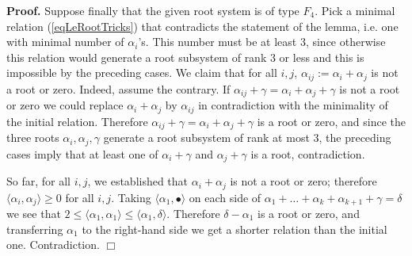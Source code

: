 \documentclass[12pt]{report}
\newtheorem{lemma}[theo]{Lemma}
\newtheorem{corollary}[theo]{Corollary}
\newenvironment{proof}[1][]{ \textbf{Proof#1. }}{$\Box$\medskip}
\newcommand{\kk}{\mathfrak{k}}
\newcommand{\hh}{\mathfrak{h}}
\newcommand{\gG}{\mathfrak{g}}
\newcommand{\linspan}{\mathrm{span}}
\begin{document}
\begin{proof}
Suppose finally that the given root system is of type $F_4$. Pick a minimal relation (\ref{eqLeRootTricks}) that contradicts the statement of the lemma, i.e. one with minimal number of $\alpha_i$'s. This number must be at least 3, since otherwise this relation would generate a root subsystem of rank 3 or less and this is impossible by the preceding cases. We claim that for all $i,j$, $\alpha_{ij}:=\alpha_i+\alpha_j$ is not a root or zero. Indeed, assume the contrary. If $\alpha_{ij}+\gamma= \alpha_i+ \alpha_j +\gamma$ is not a root or zero we could replace $\alpha_i+\alpha_j$ by $\alpha_{ij}$ in contradiction with the minimality of the initial relation. Therefore $\alpha_{ij}+\gamma= \alpha_i+ \alpha_j +\gamma$ is a root or zero, and since the three roots $\alpha_i,\alpha_j,\gamma$ generate a root subsystem of rank at most 3, the preceding cases imply that at least one of $\alpha_i+\gamma$ and $\alpha_j+\gamma$ is a root, contradiction.

So far, for all $i,j$, we established that $\alpha_i+\alpha_j$ is not a root or zero; therefore $\langle\alpha_i,\alpha_j\rangle\geq 0$ for all $i,j$.
Taking $\langle\alpha_1,\bullet \rangle$ on each side of  $\alpha_1+ \dots+ \alpha_k +\alpha_{k+1}+\gamma=\delta$ we see that $2\leq\langle\alpha_1,\alpha_1\rangle\leq \langle\alpha_1,\delta\rangle$. Therefore $\delta-\alpha_1$ is a root or zero, and transferring $\alpha_1$ to the right-hand side we get a shorter relation than the initial one. Contradiction.
\end{proof}

\end{document}
